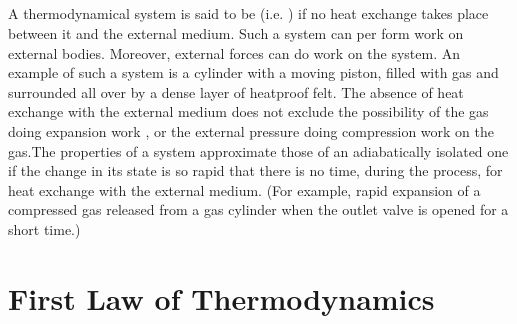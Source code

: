 \subsection{}\label{9.2.8} A thermodynamical system is said to be  (i.e. ) if no heat exchange takes place between it and the external medium. Such a system can per­ form work on external bodies. Moreover, external forces can do work on the system. An example of such a system is a cylin­der with a moving piston, filled with gas and surrounded all over by a dense layer of heatproof felt. The absence of heat exchange with the external medium does not exclude the possi­bility of the gas doing expansion work , or the external pressure doing compression work on the gas.The properties of a system approximate those of an adiabatically isolated one if the change in its state is so rapid that there is no time, during the process, for heat exchange with the external medium. (For example, rapid expansion of a com­pressed gas released from a gas cylinder when the outlet valve is opened for a short time.)

\section{First Law of Thermodynamics}
\label{sec-9.3}

